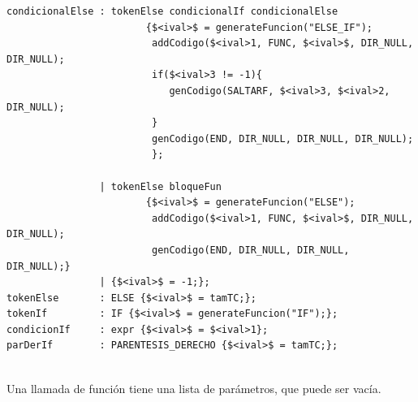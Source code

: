 \documentclass[a4paper,12pt]{article}
\begin{document}
\begin{enumerate}
\begin{enumerate}
\begin{itemize}
\begin{lstlisting}
condicionalElse	: tokenElse condicionalIf condicionalElse
						{$<ival>$ = generateFuncion("ELSE_IF");
						 addCodigo($<ival>1, FUNC, $<ival>$, DIR_NULL, DIR_NULL);
						 if($<ival>3 != -1){
					 	 	genCodigo(SALTARF, $<ival>3, $<ival>2, DIR_NULL);
					 	 }
					 	 genCodigo(END, DIR_NULL, DIR_NULL, DIR_NULL);
					 	 };

				| tokenElse bloqueFun 
						{$<ival>$ = generateFuncion("ELSE");
						 addCodigo($<ival>1, FUNC, $<ival>$, DIR_NULL, DIR_NULL);
						 genCodigo(END, DIR_NULL, DIR_NULL, DIR_NULL);}
				| {$<ival>$ = -1;};
tokenElse		: ELSE {$<ival>$ = tamTC;};
tokenIf			: IF {$<ival>$ = generateFuncion("IF");};
condicionIf 	: expr {$<ival>$ = $<ival>1};
parDerIf		: PARENTESIS_DERECHO {$<ival>$ = tamTC;};
    
    \end{lstlisting}
    Una llamada de función tiene una lista de parámetros, que puede ser vacía.
    

\end{itemize}
\end{enumerate}
\end{enumerate}
\end{document}
